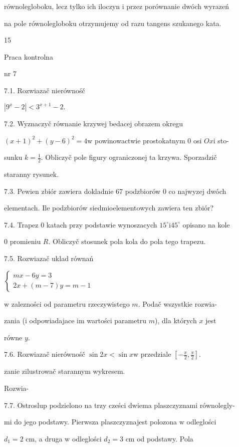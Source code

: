 \documentclass[a4paper,12pt]{article}
\begin{document}
równolegloboku, lecz tylko ich iloczyn $\mathrm{i}$ przez porównanie dwóch wyrazeń

na pole równolegloboku otrzymujemy od razu tangens szukanego kata.





15

Praca kontrolna

nr 7

7.1. Rozwiazač nierównośč

$|9^{x}-2|<3^{x+1}-2.$

7.2. Wyznaczyč równanie krzywej bedacej obrazem okregu

$(x+1)^{2}+(y-6)^{2}=4\mathrm{w}$ powinowactwie prostokatnym $0$ osi $Ox\mathrm{i}$ sto-

sunku $k=\displaystyle \frac{1}{2}$. Obliczyč pole figury ograniczonej ta krzywa. Sporzadzič

staranny rysunek.

7.3. Pewien zbiór zawiera dokladnie 67 podzbiorów $0$ co najwyzej dwóch

elementach. Ile podzbiorów siedmioelementowych zawiera ten zbiór?

7.4. Trapez $0$ katach przy podstawie wynoszacych $15^{\circ}\mathrm{i}45^{\circ}$ opisano na kole

$0$ promieniu $R$. Obliczyč stosunek pola kola do pola tego trapezu.

7.5. Rozwiazač uklad równań

$\left\{\begin{array}{l}
mx-6y=3\\
2x+(m-7)y=m-1
\end{array}\right.$

$\mathrm{w}$ zalezności od parametru rzeczywistego $m$. Podač wszystkie rozwia-

zania ($\mathrm{i}$ odpowiadajace im wartości parametru $m$), dla których $x$ jest

równe $y.$

7.6. Rozwiazač nierównośč $\sin 2x<\sin x\mathrm{w}$ przedziale $[-\displaystyle \frac{\pi}{2},\frac{\pi}{2}]$.

zanie zilustrowač starannym wykresem.

Rozwia-

7.7. Ostroslup podzielono na trzy cześci dwiema plaszczyznami równolegly-

mi do jego podstawy. Pierwsza plaszczyznajest polozona $\mathrm{w}$ odleglości

$d_{1} = 2$ cm, a druga $\mathrm{w}$ odleglości $d_{2} = 3$ cm od podstawy. Pola
\end{document}
